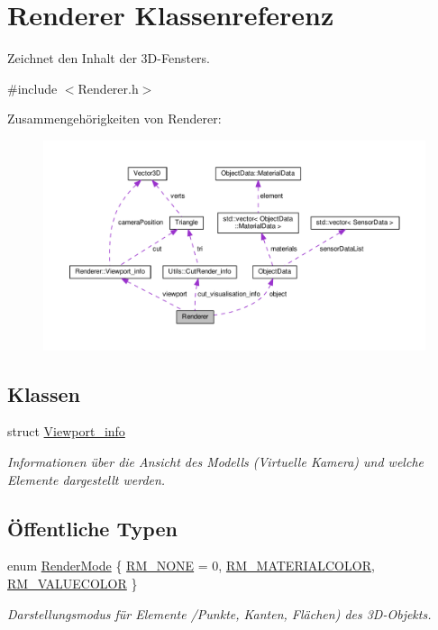 \hypertarget{classRenderer}{\section{Renderer Klassenreferenz}
\label{classRenderer}
}


Zeichnet den Inhalt der 3\-D-\/\-Fensters.  




{\ttfamily \#include $<$Renderer.\-h$>$}



Zusammengehörigkeiten von Renderer\-:\nopagebreak
\begin{figure}[H]
\begin{center}
\leavevmode
\includegraphics[width=350pt]{classRenderer__coll__graph}
\end{center}
\end{figure}
\subsection*{Klassen}
\begin{DoxyCompactItemize}
\item 
struct \hyperlink{structRenderer_1_1Viewport__info}{Viewport\-\_\-info}
\begin{DoxyCompactList}\small\item\em Informationen über die Ansicht des Modells (Virtuelle Kamera) und welche Elemente dargestellt werden. \end{DoxyCompactList}\end{DoxyCompactItemize}
\subsection*{Öffentliche Typen}
\begin{DoxyCompactItemize}
\item 
enum \hyperlink{classRenderer_aa9844470f59e9fdf3aed088936100863}{Render\-Mode} \{ \hyperlink{classRenderer_aa9844470f59e9fdf3aed088936100863a117f4ca0fdddef6e71774540e331efe9}{R\-M\-\_\-\-N\-O\-N\-E} = 0, 
\hyperlink{classRenderer_aa9844470f59e9fdf3aed088936100863a5b763e13120b7189e59806712789556b}{R\-M\-\_\-\-M\-A\-T\-E\-R\-I\-A\-L\-C\-O\-L\-O\-R}, 
\hyperlink{classRenderer_aa9844470f59e9fdf3aed088936100863aff17440f3de9508b77d4762742c00c07}{R\-M\-\_\-\-V\-A\-L\-U\-E\-C\-O\-L\-O\-R}
 \}
\begin{DoxyCompactList}\small\item\em Darstellungsmodus für Elemente /\-Punkte, Kanten, Flächen) des 3\-D-\/\-Objekts. \end{DoxyCompactList}\end{DoxyCompactItemize}
